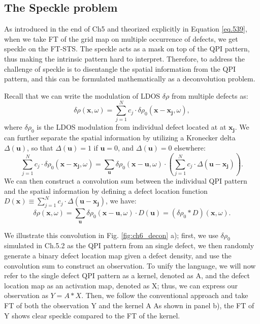 \subsection{The Speckle problem}
As introduced in the end of Ch5 and theorized explicitly in Equation \ref{eq.539}, when we take \ac{FT} of the grid map on multiple occurrence of defects, we get speckle on the \ac{FT-STS}. The speckle acts as a mask on top of the QPI pattern, thus making the intrinsic pattern hard to interpret. Therefore, to address the challenge of speckle is to disentangle the spatial information from the \ac{QPI} pattern, and this can be formulated mathematically as a deconvolution problem. 

\par \noindent Recall that we can write the modulation of \ac{LDOS} $\delta \rho$ from multiple defects as:
\begin{equation}
	\delta \rho(\mathbf{x}, \omega) = \sum_{j=1}^{N}c_j \cdot \delta \rho_0(\mathbf{x}-\mathbf{x_j},\omega),
\end{equation}
\noindent where $\delta \rho_0$ is the \ac{LDOS} modulation from individual defect located at at $\mathbf{x_j}$. We can further separate the spatial information by utilizing a Kronecker delta $\Delta(\mathbf{u})$, so that $\Delta(\mathbf{u})=1$ if $\mathbf{u} = 0$, and $\Delta(\mathbf{u})=0$ elsewhere: 
\begin{equation}
	\sum_{j=1}^{N}c_j \cdot \delta \rho_0(\mathbf{x}-\mathbf{x_j},\omega) = \sum_{\mathbf{u}} \delta \rho_0(\mathbf{x}-\mathbf{u},\omega)\cdot(\sum_{j=1}^{N} c_j \cdot \Delta(\mathbf{u-x_j})).
\end{equation}
\noindent We can then construct a convolution sum between the individual \ac{QPI} pattern and the spatial information by defining a defect location function $D(\mathbf{x}) \equiv \sum_{j=1}^{N} c_j \cdot \Delta(\mathbf{u-x_j})$, we have: 
\begin{equation}
	\delta \rho(\mathbf{x}, \omega) =  \sum_{\mathbf{u}} \delta \rho_0(\mathbf{x}-\mathbf{u},\omega)\cdot D(\mathbf{u}) = (\delta \rho_0 *D)(\mathbf{x}, \omega).
\end{equation}

We illustrate this convolution in Fig. \ref{fig:ch6_decon} a); first, we use $\delta \rho_0$ simulated in Ch.5.2 as the \ac{QPI} pattern from an single defect, we then randomly generate a binary defect location map given a defect density, and use the convolution sum to construct an observation. To unify the language, we will now refer to the single defect \ac{QPI} pattern as a kernel, denoted as A, and the defect location map as an activation map, denoted as X; thus, we can express our observation as $Y = A * X$. Then, we follow the conventional approach and take \ac{FT} of both the observation Y and the kernel A As shown in panel b), the \ac{FT} of Y shows clear speckle compared to the \ac{FT} of the kernel.

